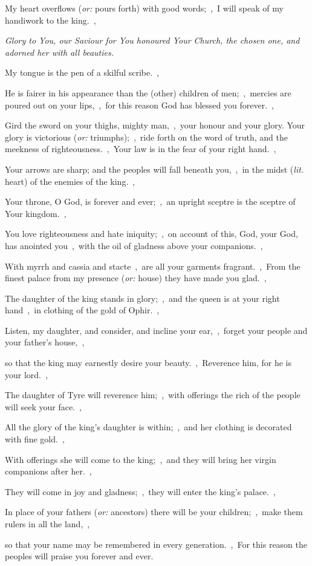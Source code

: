 \documentclass[12pt,twoside,a5paper]{article}
\newcommand{\qanona}[1]{{\liturgicalhint{Qanona.} \emph{#1}}}
\newcommand{\translationoption}[1]{\emph{or:} #1}
\newcommand{\translationliteral}[1]{\emph{lit.} #1}
\begin{document}
\begin{normalparskip}
  My heart overflows (\translationoption{pours forth}) with good words;~\sep\ I will speak of my handiwork to the king.~\sep

  \qanona{Glory to You, our Saviour for You honoured Your Church, the chosen one, and adorned her with all beauties.}

  My tongue is the pen of a skilful scribe.~\sep

  He is fairer in his appearance than the (other) children of men;~\sep\ mercies are poured out on your lips,~\sep\ for this reason God has blessed you forever.~\sep

  Gird the sword on your thighs, mighty man,~\sep\ your honour and your glory. Your glory is victorious (\translationoption{triumphs});~\sep\ ride forth on the word of truth, and the meekness of righteousness.~\sep\ Your law is in the fear of your right hand.~\sep

  Your arrows are sharp; and the peoples will fall beneath you,~\sep\ in the midst (\translationliteral{heart}) of the enemies of the king.~\sep

  Your throne, O God, is forever and ever;~\sep\ an upright sceptre is the sceptre of Your kingdom.~\sep

  You love righteousness and hate iniquity;~\sep\ on account of this, God, your God, has anointed you~\sep\ with the oil of gladness above your companions.~\sep

  With myrrh and cassia and stacte~\sep\ are all your garments fragrant.~\sep\ From the finest palace from my presence (\translationoption{house}) they have made you glad.~\sep

  The daughter of the king stands in glory;~\sep\ and the queen is at your right hand~\sep\ in clothing of the gold of Ophir.~\sep

  Listen, my daughter, and consider, and incline your ear,~\sep\ forget your people and your father's house,~\sep

  so that the king may earnestly desire your beauty.~\sep\ Reverence him, for he is your lord.~\sep

  The daughter of Tyre will reverence him;~\sep\ with offerings the rich of the people will seek your face.~\sep

  All the glory of the king's daughter is within;~\sep\ and her clothing is decorated with fine gold.~\sep

  With offerings she will come to the king;~\sep\ and they will bring her virgin companions after her.~\sep

  They will come in joy and gladness;~\sep\ they will enter the king's palace.~\sep

  In place of your fathers (\translationoption{ancestors}) there will be your children;~\sep\ make them rulers in all the land,~\sep

  so that your name may be remembered in every generation.~\sep\ For this reason the peoples will praise you forever and ever.
\end{normalparskip}
\end{document}
